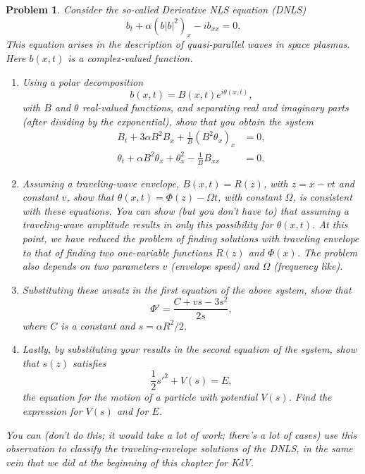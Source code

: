 \documentclass[12pt]{report}
\newtheorem{problem}{Problem}
\begin{document}
\begin{problem}
    Consider the so-called Derivative NLS equation (DNLS)
$$
b_t+\alpha \left(b |b|^2\right)_x-i b_{xx}=0.
$$
This equation arises in the description of quasi-parallel waves in space plasmas. Here $b(x,t)$ is a complex-valued function.
\begin{enumerate}

\item[{\bf a.}] Using a polar decomposition
$$
b(x,t)=B(x,t)e^{i\theta(x,t)},
$$
with $B$ and $\theta$ real-valued functions, and separating real and imaginary parts (after dividing by the exponential), show that you obtain the system
\begin{align*}
B_t+3\alpha B^2 B_x+\frac{1}{B}(B^2 \theta_x)_x&=0,\\
\theta_t+\alpha B^2 \theta_x+\theta_x^2-\frac{1}{B}B_{xx}&=0.
\end{align*}

\item[{\bf b.}] Assuming a traveling-wave envelope, $B(x,t)=R(z)$, with $z=x-vt$  and constant $v$, show that $\theta(x,t)=\Phi(z)-\Omega t$, with constant $\Omega$, is consistent with these equations. You can show (but you don't have to) that assuming a traveling-wave amplitude results in only this possibility for $\theta(x,t)$. At this point, we have reduced the problem of finding solutions with traveling envelope to that of finding two one-variable functions $R(z)$ and $\Phi(x)$. The problem also depends on two parameters $v$ (envelope speed) and $\Omega$ (frequency like).

\item[{\bf c.}] Substituting these ansatz in the first equation of the above system, show that
\[
\Phi'=\frac{C+vs-3s^2}{2s},
\]
where $C$ is a constant and $s=\alpha R^2/2$.

\item[{\bf d.}] Lastly, by substituting your results in the second equation of the system, show that $s(z)$ satisfies
\[
\frac{1}{2}s'^2+V(s)=E,
\]
the equation for the motion of a particle with potential $V(s)$. Find the expression for $V(s)$ and for $E$.

\end{enumerate}

You can (don't do this; it would take a lot of work; there's a lot of cases) use this observation to classify the traveling-envelope solutions of the DNLS, in the same vein that we did at the beginning of this chapter for KdV.

\end{problem}
\end{document}
